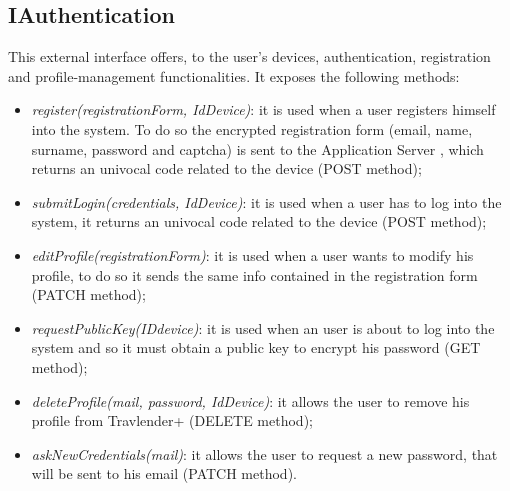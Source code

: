 \subsection{IAuthentication}
\label{subsect:IAuthentication}
This external interface offers, to the user's devices, authentication, registration and profile-management functionalities. It exposes the following methods:
\begin{itemize}
	\item \textit{register(registrationForm, IdDevice)}: it is used when a user registers himself into the system. To do so the encrypted registration form (email, name, surname, password and captcha) is sent to the Application Server , which returns an univocal code related to the device (POST method);
	\item \textit{submitLogin(credentials, IdDevice)}: it is used when a user has to log into the system, it returns an univocal code related to the device (POST method);
	\item \textit{editProfile(registrationForm)}: it is used when a user wants to modify his profile, to do so it sends the same info contained in the registration form (PATCH method);
	\item \textit{requestPublicKey(IDdevice)}: it is used when an user is about to log into the system and so it must obtain a public key to encrypt his password (GET method);
	\item \textit{deleteProfile(mail, password, IdDevice)}: it allows the user to remove his profile from Travlender+ (DELETE method);
	\item \textit{askNewCredentials(mail)}: it allows the user to request a new password, that will be sent to his email (PATCH method).
\end{itemize}

